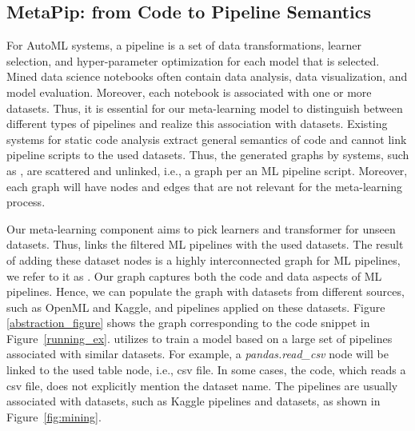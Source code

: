

\subsection{MetaPip: from Code to Pipeline Semantics}
\label{abstraction}

For AutoML systems, a pipeline is a set of data transformations, learner selection, and hyper-parameter optimization for each model that is selected. Mined data science notebooks often contain data analysis, data visualization, and model evaluation. Moreover, each notebook is associated with one or more datasets. Thus, it is essential for our meta-learning model to distinguish between different types of pipelines and realize this association with datasets. Existing systems for static code analysis extract general semantics of code and cannot link pipeline scripts to the used datasets.  Thus, the generated graphs by systems, such as {\sysGC}, are scattered and unlinked, i.e., a graph per an ML pipeline script. Moreover, each graph will have nodes and edges that are not relevant for the meta-learning process. 

Our meta-learning component aims to pick learners and transformer for unseen datasets. Thus, {\sysname} links the filtered ML pipelines with the used datasets. The result of adding these dataset nodes is a highly interconnected graph for ML pipelines, we refer to it as \textit{{\GML}}. Our  {\GML} graph captures both the code and data aspects of ML pipelines. Hence, we can populate the {\GML} graph with datasets from different sources, such as OpenML and Kaggle, and pipelines applied on these datasets. Figure \ref{abstraction_figure} shows the {\GML} graph corresponding to the code snippet in Figure~\ref{running_ex}. {\sysname} utilizes {\GML} to train a model based on a large set of pipelines associated with similar datasets. For example, a \textit{pandas.read\_csv} node will be linked to the used table node, i.e., csv file. In some cases, the code, which reads a csv file, does not explicitly mention the dataset name. The pipelines are usually associated with datasets, such as Kaggle pipelines and datasets, as shown in Figure~\ref{fig:mining}. 



